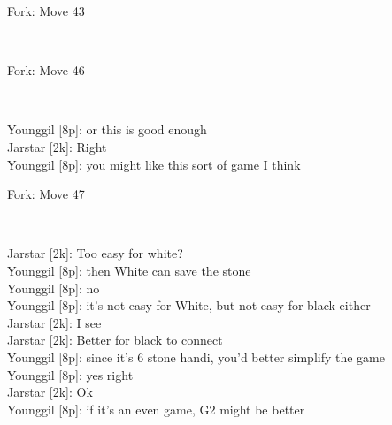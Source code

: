 \documentclass{article}
\begin{document}
\begin{subsection}{Fork: Move 43}
\begin{center}
\cleargoban
{}
\showfullgoban
\\\parbox{4.5in}{
}
\end{center}
\end{subsection}
\begin{subsection}{Fork: Move 46}
\begin{center}
\cleargoban
{}
\showfullgoban
\\\parbox{4.5in}{
Younggil [8p]: or this is good enough\\Jarstar [2k]: Right\\Younggil [8p]: you might like this sort of game I think\\}
\end{center}
\end{subsection}
\begin{subsection}{Fork: Move 47}
\begin{center}
\cleargoban
{}
\showfullgoban
\\\parbox{4.5in}{
Jarstar [2k]: Too easy for white?\\Younggil [8p]: then White can save the stone\\Younggil [8p]: no\\Younggil [8p]: it's not easy for White, but not easy for black either\\Jarstar [2k]: I see\\Jarstar [2k]: Better for black to connect\\Younggil [8p]: since it's 6 stone handi, you'd better simplify the game\\Younggil [8p]: yes right\\Jarstar [2k]: Ok\\Younggil [8p]: if it's an even game, G2 might be better\\}
\end{center}
\end{subsection}
\end{document}
